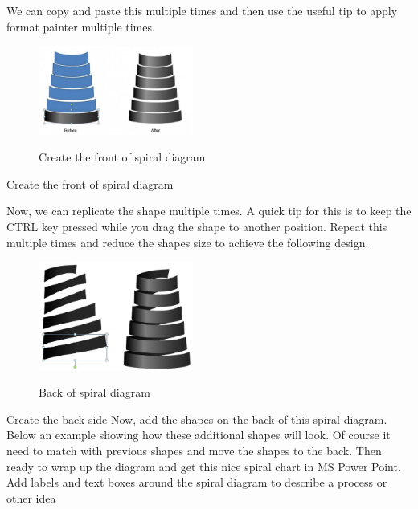 	
We can copy and paste this multiple times and then use the useful tip to apply format painter multiple times.

\begin{figure}
  \includegraphics[width=2in]{figure10.eps}\cite { Stephen Moffat}
  \caption {Create the front of spiral diagram}\label{3.11}
\end{figure}




Create the front of spiral diagram

Now, we can replicate the shape multiple times. A quick tip for this is to keep the CTRL key pressed while you drag the shape to another position. Repeat this multiple times and reduce the shapes size to achieve the following design.


\begin{figure}
  \includegraphics[width=2in]{figure12.eps}\cite { Stephen Moffat}
  \caption {Back of spiral diagram}\label{3.14}
\end{figure}
Create the back side
Now, add the shapes on the back of this spiral diagram. Below an example showing how these additional shapes will look. Of course it need to match with previous shapes and move the shapes to the back.
Then ready to wrap up the diagram and get this nice spiral chart in  MS Power Point. Add labels and text boxes around the spiral diagram to describe a process or other idea



















